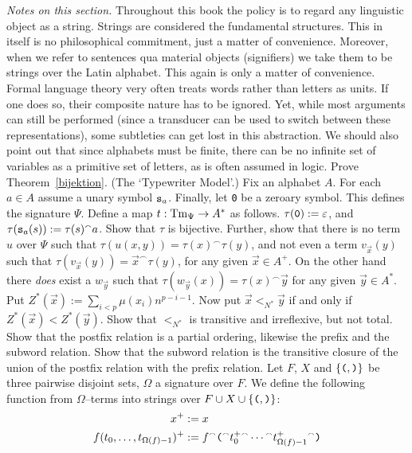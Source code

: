 {\it Notes on this section.} Throughout this book the policy is to 
regard any linguistic object as a string. Strings are considered 
the fundamental structures. This in itself is no philosophical 
commitment, just a matter of convenience. Moreover, when we refer 
to sentences qua material objects (signifiers) we take them to be 
strings over the Latin alphabet. This again is only a matter of 
convenience. Formal language theory very often treats words rather 
than letters as units. If one does so, their composite nature has 
to be ignored. Yet, while most arguments can still be performed 
(since a transducer can be used to switch between these 
representations), some subtleties can get lost in this abstraction. 
We should also point out that since alphabets must be finite, there 
can be no infinite set of variables as a primitive set of letters, 
as is often assumed in logic. 
\vplatz
\exercise
Prove Theorem~\ref{bijektion}.
\vplatz
\exercise
(The `Typewriter Model'.) Fix an alphabet $A$. For each $a \in A$ 
assume a unary symbol $\mbox{\tt s}_a$. Finally, let {\tt 0} be 
a zeroary symbol. This defines the signature $\Psi$. Define a 
map $t : \operatorname{Tm}_{\Psi} \rightarrow A^{\ast}$ as follows. $\tau(\mbox{\tt 0}) := 
\varepsilon$, and $\tau(\mbox{\tt s}_a(s)) := \tau(s)^{\smallfrown}a$.
Show that $\tau$ is bijective. Further, show that there is no 
term $u$ over $\Psi$ such that $\tau(u(x,y)) = 
\tau(x)^{\smallfrown}\tau(y)$, and not even a term 
$v_{\vec{x}}(y)$ such that $\tau(v_{\vec{x}}(y)) = \vec{x}^{\smallfrown}%
\tau(y)$, for any given $\vec{x} \in A^+$. On the other hand 
there {\it does\/} exist a $w_{\vec{y}}$ such that 
$\tau(w_{\vec{y}}(x)) = \tau(x)^{\smallfrown}\vec{y}$ for 
any given $\vec{y} \in A^{\ast}$.
\vplatz
\exercise
Put $Z^{\ast}(\vec{x}) := \sum_{i < p} \mu(x_i)n^{p-i-1}$. Now put
$\vec{x} <_{N^{\ast}} \vec{y}$ if and only if $Z^{\ast}(\vec{x})
< Z^{\ast}(\vec{y})$. Show that $<_{N^{\ast}}$ is transitive and
irreflexive, but not total.
\vplatz
\exercise
Show that the postfix relation is a partial ordering,
likewise the prefix and the subword relation. Show that
the subword relation is the transitive closure of the
union of the postfix relation with the prefix relation.
\vplatz
\exercise
Let $F$, $X$ and $\{\mbox{\tt (}, \mbox{\tt )}\}$ be three
pairwise disjoint sets, $\Omega$ a signature over $F$.
We define the following function from $\Omega$--terms into
strings over $F \cup X \cup \{\mbox{\tt (},
\mbox{\tt )}\}$:
\begin{equation}
\begin{split}
x^+ & := x \\
f(t_0, \dotsc, t_{\Omega(f)-1})^+ & :=
    f{^{\smallfrown}} \mbox{\tt (} {^{\smallfrown}} t_0^+ {^{\smallfrown}} \dotsb {^{\smallfrown}} t_{\Omega(f)-1}^+
    {^{\smallfrown}}\mbox{\tt )}
\end{split}
\end{equation}
